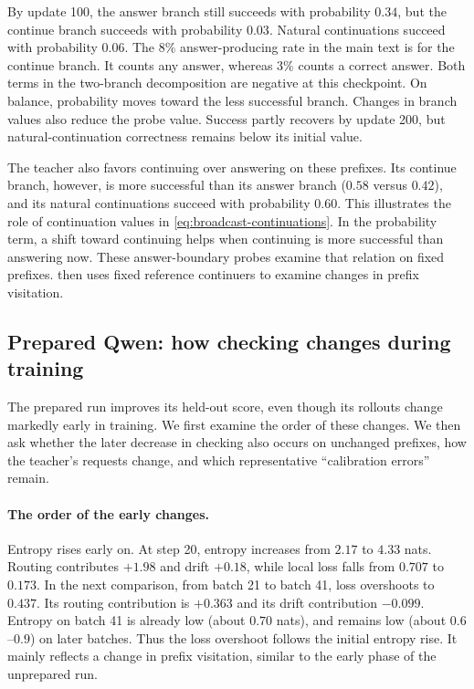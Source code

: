 By update 100, the answer branch still succeeds with probability $0.34$, but the continue branch succeeds with probability $0.03$. Natural continuations succeed with probability $0.06$. The $8\%$ answer-producing rate in the main text is for the continue branch. It counts any answer, whereas $3\%$ counts a correct answer. Both terms in the two-branch decomposition are negative at this checkpoint. On balance, probability moves toward the less successful branch. Changes in branch values also reduce the probe value. Success partly recovers by update 200, but natural-continuation correctness remains below its initial value.

The teacher also favors continuing over answering on these prefixes. Its continue branch, however, is more successful than its answer branch ($0.58$ versus $0.42$), and its natural continuations succeed with probability $0.60$. This illustrates the role of continuation values in \cref{eq:broadcast-continuations}. In the probability term, a shift toward continuing helps when continuing is more successful than answering now. These answer-boundary probes examine that relation on fixed prefixes.  then uses fixed reference continuers to examine changes in prefix visitation.

\FloatBarrier
{}
\subsection{Prepared Qwen: how checking changes during training}
\label{app:rd-prepared}

The prepared run improves its held-out score, even though its rollouts change markedly early in training. We first examine the order of these changes. We then ask whether the later decrease in checking also occurs on unchanged prefixes, how the teacher's requests change, and which representative ``calibration errors'' remain.

\paragraph{The order of the early changes.}
Entropy rises early on. At step 20, entropy increases from $2.17$ to $4.33$ nats. Routing contributes $+1.98$ and drift $+0.18$, while local loss falls from $0.707$ to $0.173$. In the next comparison, from batch 21 to batch 41, loss overshoots to $0.437$. Its routing contribution is $+0.363$ and its drift contribution $-0.099$. Entropy on batch 41 is already low (about $0.70$ nats), and remains low (about $0.6$--$0.9$) on later batches. Thus the loss overshoot follows the initial entropy rise. It mainly reflects a change in prefix visitation, similar to the early phase of the unprepared run.

